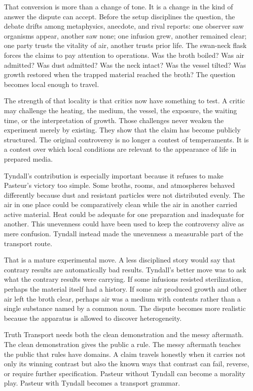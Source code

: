 That conversion is more than a change of tone. It is a change in the kind
of answer the dispute can accept. Before the setup disciplines the
question, the debate drifts among metaphysics, anecdote, and rival
reports: one observer saw organisms appear, another saw none; one infusion
grew, another remained clear; one party trusts the vitality of air,
another trusts prior life. The swan-neck flask forces the claims to pay
attention to operations. Was the broth boiled? Was air admitted? Was dust
admitted? Was the neck intact? Was the vessel tilted? Was growth restored
when the trapped material reached the broth? The question becomes local
enough to travel.

The strength of that locality is that critics now have something to test.
A critic may challenge the heating, the medium, the vessel, the exposure,
the waiting time, or the interpretation of growth. Those challenges never
weaken the experiment merely by existing. They show that the claim has
become publicly structured. The original controversy is no longer a
contest of temperaments. It is a contest over which local conditions are
relevant to the appearance of life in prepared media.

Tyndall's contribution is especially important because it refuses to make
Pasteur's victory too simple. Some broths, rooms, and atmospheres behaved
differently because dust and resistant particles were not distributed
evenly. The air in one place could be comparatively clean while the air in
another carried active material. Heat could be adequate for one
preparation and inadequate for another. This unevenness could have been
used to keep the controversy alive as mere confusion. Tyndall instead made
the unevenness a measurable part of the transport route.

That is a mature experimental move. A less disciplined story would say
that contrary results are automatically bad results. Tyndall's better move
was to ask what the contrary results were carrying. If some infusions
resisted sterilization, perhaps the material itself had a history. If some
air produced growth and other air left the broth clear, perhaps air was a
medium with contents rather than a single substance named by a common
noun. The dispute becomes more realistic because the apparatus is allowed
to discover heterogeneity.

Truth Transport needs both the clean demonstration and the messy aftermath.
The clean demonstration gives the public a rule. The messy aftermath
teaches the public that rules have domains. A claim travels honestly when
it carries not only its winning contrast but also the known ways that
contrast can fail, reverse, or require further specification. Pasteur
without Tyndall can become a morality play. Pasteur with Tyndall becomes a
transport grammar.

